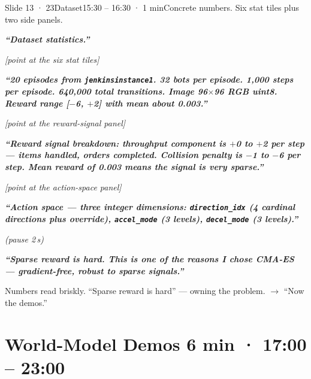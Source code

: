 \documentclass[11pt,a4paper]{article}
\newcommand{\say}[1]{%
    \par\vspace{0.3em}%
    \begingroup
    \leftskip=12pt
    \rightskip=8pt
    \color{thStrong}%
    \itshape\textbf{“#1”}%
    \par
    \endgroup
    \vspace{0.2em}
}
\newcommand{\beat}[1][2]{%
    \par\textcolor{thMuted}{\small\textit{(pause #1\,s)}}\par
    \vspace{0.2em}
}
\newcommand{\stage}[1]{%
    \par\textcolor{thMuted}{\small\textit{[#1]}}\par
    \vspace{0.2em}
}
\newcommand{\emphw}[1]{\textbf{\textcolor{thAmber}{#1}}}
\begin{document}
\begin{slide}{Slide 13 · 23}{Dataset}{15:30 – 16:30 · 1 min}{Concrete numbers. Six stat tiles plus two side panels.}
\say{Dataset statistics.}

\stage{point at the six stat tiles}

\say{\textbf{20 episodes} from \texttt{jenkinsinstance1}. \textbf{32 bots} per episode. \textbf{1{,}000 steps} per episode. \textbf{640{,}000} total transitions. Image \textbf{96$\times$96} RGB uint8. Reward range \textbf{[$-$6, $+$2]} with mean about \textbf{0.003}.}

\stage{point at the reward-signal panel}

\say{Reward signal breakdown: throughput component is \textbf{$+$0 to $+$2 per step} — items handled, orders completed. Collision penalty is \textbf{$-$1 to $-$6 per step}. Mean reward of 0.003 means the signal is very sparse.}

\stage{point at the action-space panel}

\say{Action space — three integer dimensions: \texttt{direction\_idx} (4 cardinal directions plus override), \texttt{accel\_mode} (3 levels), \texttt{decel\_mode} (3 levels).}
\beat
\say{Sparse reward is hard. This is one of the reasons I chose \emphw{CMA-ES} — gradient-free, robust to sparse signals.}

\begin{stagebox}
Numbers read briskly. ``Sparse reward is hard'' — owning the problem. $\rightarrow$ ``Now the demos.''
\end{stagebox}
\end{slide}

\section{World-Model Demos \hfill \textcolor{thMuted}{\small 6 min · 17:00 – 23:00}}
\end{document}

